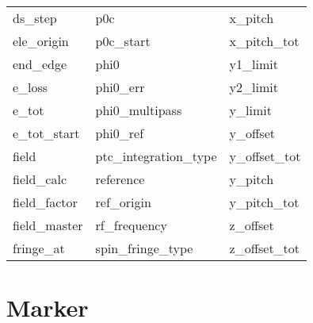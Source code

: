 \begin{tabular}{lll}
ds_step                     & p0c                         & x_pitch                     \\
ele_origin                  & p0c_start                   & x_pitch_tot                 \\
end_edge                    & phi0                        & y1_limit                    \\
e_loss                      & phi0_err                    & y2_limit                    \\
e_tot                       & phi0_multipass              & y_limit                     \\
e_tot_start                 & phi0_ref                    & y_offset                    \\
field                       & ptc_integration_type        & y_offset_tot                \\
field_calc                  & reference                   & y_pitch                     \\
field_factor                & ref_origin                  & y_pitch_tot                 \\
field_master                & rf_frequency                & z_offset                    \\
fringe_at                   & spin_fringe_type            & z_offset_tot                \\
 \bottomrule
 \end{tabular}
 \vfill
 
 \section{Marker}
 \label{s:list.marker}
 

